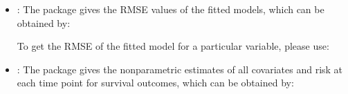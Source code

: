 \documentclass[letterpaper,10pt,english]{sphinxmanual}
\begin{document}
\begin{itemize}
\begin{quote}
\begin{sphinxVerbatim}[commandchars=\\\{\}]
  \PYG{p}{[}\PYG{p}{]}\PYG{p}{[}\PYG{p}{]}
\end{sphinxVerbatim}
\end{quote}

\item {} 
\sphinxAtStartPar
{}: The package gives the RMSE values of the fitted models, which can be obtained by:
\begin{quote}

\begin{sphinxVerbatim}[commandchars=\\\{\}]
  \PYG{p}{[}\PYG{p}{]}
\end{sphinxVerbatim}
\end{quote}

\sphinxAtStartPar
To get the RMSE of the fitted model for a particular variable, please use:
\begin{quote}

\begin{sphinxVerbatim}[commandchars=\\\{\}]
  \PYG{p}{[}\PYG{p}{]}\PYG{p}{[}\PYG{p}{]}
\end{sphinxVerbatim}
\end{quote}

\item {} 
\sphinxAtStartPar
{}: The package gives the nonparametric estimates of all covariates and risk at each time point for survival outcomes, which can be obtained by:
\begin{quote}

\begin{sphinxVerbatim}[commandchars=\\\{\}]
  \PYG{p}{[}\PYG{p}{]}
\end{sphinxVerbatim}
\end{quote}


\end{itemize}
\end{document}
